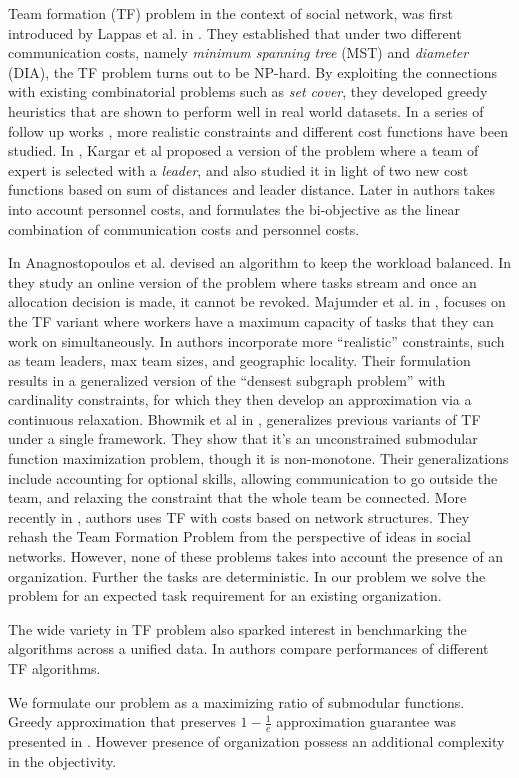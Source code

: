 Team formation (TF) problem in the context of social network, was first introduced by Lappas et al. in \cite{lappas2009finding}. They established that under two different communication costs, namely \textit{minimum spanning tree} (MST) and \textit{diameter} (DIA), the TF problem turns out to be NP-hard. By exploiting the connections with existing combinatorial problems such as \textit{set cover}, they developed greedy heuristics that are shown to perform well in real world datasets. In a series of follow up works \cite{anagnostopoulos2010power,kargar2011discovering,anagnostopoulos2012online,majumder2012capacitated,kargar2012efficient,kargar2013finding}, more realistic constraints and different cost functions have been studied. In \cite{kargar2011discovering}, Kargar et al proposed a version of the problem where a team of expert is selected with a \textit{leader}, and also studied it in light of two new cost functions based on sum of distances and leader distance. Later in \cite{kargar2012efficient,kargar2013finding} authors takes into account personnel costs, and formulates the bi-objective as the linear combination of communication costs and personnel costs. 

In \cite{anagnostopoulos2010power} Anagnostopoulos et al. devised an algorithm to keep the workload balanced. In \cite{anagnostopoulos2012online} they study an online version of the problem where tasks stream and once an allocation decision is made, it cannot be revoked. Majumder et al. in \cite{majumder2012capacitated}, focuses on the TF variant where workers have a maximum capacity of tasks that they can work on simultaneously. In \cite{rangapuram2013towards} authors incorporate more ``realistic'' constraints, such as team leaders, max team sizes, and geographic locality. Their formulation results in a generalized version of the ``densest subgraph problem'' with cardinality constraints, for which they then develop an approximation via a continuous relaxation. Bhowmik et al in \cite{bhowmik2014submodularity}, generalizes previous variants of TF under a single framework. They show that it's an unconstrained submodular function maximization problem, though it is non-monotone. Their generalizations include accounting for optional skills, allowing communication to go outside the team, and relaxing the constraint that the whole team be connected. More recently in \cite{farasat2016social}, authors uses TF with costs based on network structures. They rehash the Team Formation Problem from the perspective of ideas in social networks. However, none of these problems takes into account the presence of an organization. Further the tasks are deterministic. In our problem we solve the problem for an expected task requirement for an existing organization.

The wide variety in TF problem also sparked interest in benchmarking the algorithms across a unified data. In \cite{wang2015comparative} authors compare performances of different TF algorithms. 

We formulate our problem as a maximizing ratio of submodular functions. Greedy approximation that preserves $1 - \frac{1}{e}$ approximation guarantee was presented in \cite{bai2016algorithms}. However presence of organization possess an additional complexity in the objectivity. 


